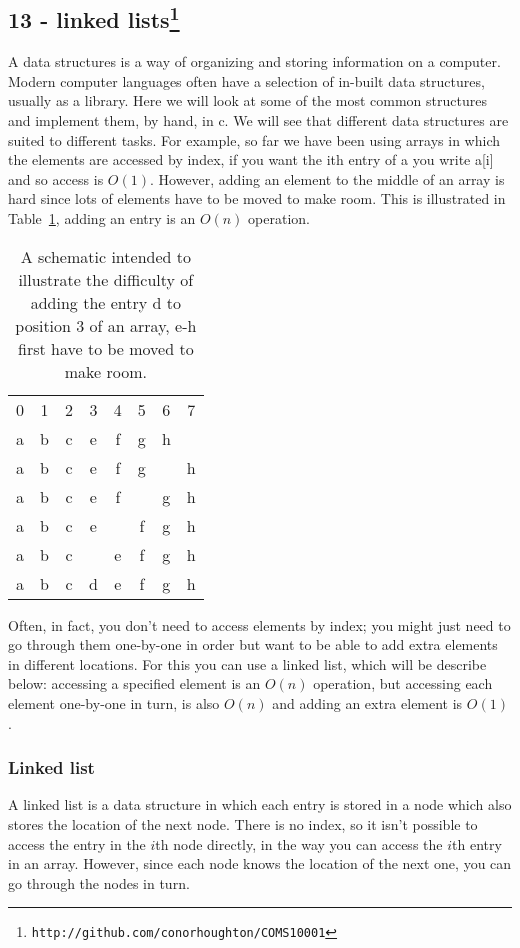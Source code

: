 \documentclass[11pt,a4paper]{scrartcl}
\begin{document}
\subsection*{13 - linked lists\footnote{\texttt{http://github.com/conorhoughton/COMS10001}}}

A data structures is a way of organizing and storing information on a
computer. Modern computer languages often have a selection of in-built
data structures, usually as a library. Here we will look at some of
the most common structures and implement them, by hand, in c. We will
see that different data structures are suited to different tasks. For
example, so far we have been using arrays in which the elements are
accessed by index, if you want the ith entry of a you write a[i] and
so access is $O(1)$. However, adding an element to the middle of an
array is hard since lots of elements have to be moved to make
room. This is illustrated in Table~\ref{table_reindexing}, adding an
entry is an $O(n)$ operation.

\begin{table}[b]
\begin{tabular}{cccc cccc}
0&1&2&3&4&5&6&7\\
a&b&c&e&f&g&h&\\
a&b&c&e&f&g&&h\\
a&b&c&e&f&&g&h\\
a&b&c&e&&f&g&h\\
a&b&c&&e&f&g&h\\
a&b&c&d&e&f&g&h
\end{tabular}
\caption{A schematic intended to illustrate the difficulty of adding the entry d to position 3 of an array, e-h first have to be moved to make room.\label{table_reindexing}}
\end{table}

Often, in fact, you don't need to access elements by index; you might
just need to go through them one-by-one in order but want to be able
to add extra elements in different locations. For this you can use a
linked list, which will be describe below: accessing a specified
element is an $O(n)$ operation, but accessing each element one-by-one
in turn, is also $O(n)$ and adding an extra element is $O(1)$.

\subsubsection*{Linked list}

A linked list is a data structure in which each entry is stored in a
node which also stores the location of the next node. There is no
index, so it isn't possible to access the entry in the $i$th node
directly, in the way you can access the $i$th entry in an
array. However, since each node knows the location of the next one,
you can go through the nodes in turn.
\end{document}
